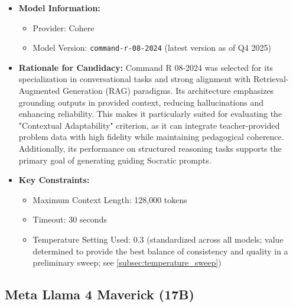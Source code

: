 \begin{itemize}
    \item \textbf{Model Information:} 
        \begin{itemize}
            \item Provider: Cohere
            \item Model Version: \verb|command-r-08-2024| (latest version as of Q4 2025)
        \end{itemize}
    \item \textbf{Rationale for Candidacy:} 
        Command R 08-2024 was selected for its specialization in conversational tasks and strong alignment with Retrieval-Augmented Generation (RAG) paradigms. Its architecture emphasizes grounding outputs in provided context, reducing hallucinations and enhancing reliability. This makes it particularly suited for evaluating the "Contextual Adaptability" criterion, as it can integrate teacher-provided problem data with high fidelity while maintaining pedagogical coherence. Additionally, its performance on structured reasoning tasks supports the primary goal of generating guiding Socratic prompts.
    \item \textbf{Key Constraints:}
        \begin{itemize}
            \item Maximum Context Length: 128,000 tokens
            \item Timeout: 30 seconds
            \item Temperature Setting Used: 0.3 (standardized across all models; value determined to provide the best balance of consistency and quality in a preliminary sweep; see \cref{subsec:temperature_sweep})
        \end{itemize}
\end{itemize}


\subsection{Meta Llama 4 Maverick (17B)}
\label{sec:model_llama_4}

